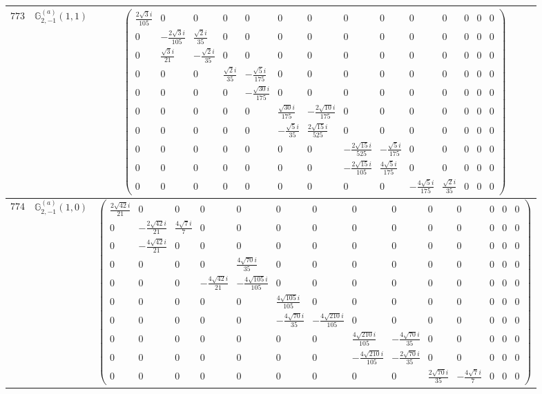 \documentclass[fleqn,8pt,landscape]{jsarticle}
\begin{document}
\begin{center}
\begin{longtable}{ccc}
$ 773 $ & $ \mathbb{G}_{2,-1}^{(a)}(1,1) $ & $ \begin{pmatrix} \frac{2 \sqrt{3} i}{105} & 0 & 0 & 0 & 0 & 0 & 0 & 0 & 0 & 0 & 0 & 0 & 0 & 0 \\ 0 & - \frac{2 \sqrt{3} i}{105} & \frac{\sqrt{2} i}{35} & 0 & 0 & 0 & 0 & 0 & 0 & 0 & 0 & 0 & 0 & 0 \\ 0 & \frac{\sqrt{3} i}{21} & - \frac{\sqrt{2} i}{35} & 0 & 0 & 0 & 0 & 0 & 0 & 0 & 0 & 0 & 0 & 0 \\ 0 & 0 & 0 & \frac{\sqrt{2} i}{35} & - \frac{\sqrt{5} i}{175} & 0 & 0 & 0 & 0 & 0 & 0 & 0 & 0 & 0 \\ 0 & 0 & 0 & 0 & - \frac{\sqrt{30} i}{175} & 0 & 0 & 0 & 0 & 0 & 0 & 0 & 0 & 0 \\ 0 & 0 & 0 & 0 & 0 & \frac{\sqrt{30} i}{175} & - \frac{2 \sqrt{10} i}{175} & 0 & 0 & 0 & 0 & 0 & 0 & 0 \\ 0 & 0 & 0 & 0 & 0 & - \frac{\sqrt{5} i}{35} & \frac{2 \sqrt{15} i}{525} & 0 & 0 & 0 & 0 & 0 & 0 & 0 \\ 0 & 0 & 0 & 0 & 0 & 0 & 0 & - \frac{2 \sqrt{15} i}{525} & - \frac{\sqrt{5} i}{175} & 0 & 0 & 0 & 0 & 0 \\ 0 & 0 & 0 & 0 & 0 & 0 & 0 & - \frac{2 \sqrt{15} i}{105} & \frac{4 \sqrt{5} i}{175} & 0 & 0 & 0 & 0 & 0 \\ 0 & 0 & 0 & 0 & 0 & 0 & 0 & 0 & 0 & - \frac{4 \sqrt{5} i}{175} & \frac{\sqrt{2} i}{35} & 0 & 0 & 0 \end{pmatrix} $ \\ \hline
$ 774 $ & $ \mathbb{G}_{2,-1}^{(a)}(1,0) $ & $ \begin{pmatrix} \frac{2 \sqrt{42} i}{21} & 0 & 0 & 0 & 0 & 0 & 0 & 0 & 0 & 0 & 0 & 0 & 0 & 0 \\ 0 & - \frac{2 \sqrt{42} i}{21} & \frac{4 \sqrt{7} i}{7} & 0 & 0 & 0 & 0 & 0 & 0 & 0 & 0 & 0 & 0 & 0 \\ 0 & - \frac{4 \sqrt{42} i}{21} & 0 & 0 & 0 & 0 & 0 & 0 & 0 & 0 & 0 & 0 & 0 & 0 \\ 0 & 0 & 0 & 0 & \frac{4 \sqrt{70} i}{35} & 0 & 0 & 0 & 0 & 0 & 0 & 0 & 0 & 0 \\ 0 & 0 & 0 & - \frac{4 \sqrt{42} i}{21} & - \frac{4 \sqrt{105} i}{105} & 0 & 0 & 0 & 0 & 0 & 0 & 0 & 0 & 0 \\ 0 & 0 & 0 & 0 & 0 & \frac{4 \sqrt{105} i}{105} & 0 & 0 & 0 & 0 & 0 & 0 & 0 & 0 \\ 0 & 0 & 0 & 0 & 0 & - \frac{4 \sqrt{70} i}{35} & - \frac{4 \sqrt{210} i}{105} & 0 & 0 & 0 & 0 & 0 & 0 & 0 \\ 0 & 0 & 0 & 0 & 0 & 0 & 0 & \frac{4 \sqrt{210} i}{105} & - \frac{4 \sqrt{70} i}{35} & 0 & 0 & 0 & 0 & 0 \\ 0 & 0 & 0 & 0 & 0 & 0 & 0 & - \frac{4 \sqrt{210} i}{105} & - \frac{2 \sqrt{70} i}{35} & 0 & 0 & 0 & 0 & 0 \\ 0 & 0 & 0 & 0 & 0 & 0 & 0 & 0 & 0 & \frac{2 \sqrt{70} i}{35} & - \frac{4 \sqrt{7} i}{7} & 0 & 0 & 0 \end{pmatrix} $ \\ \hline

\end{longtable}
\end{center}
\end{document}
